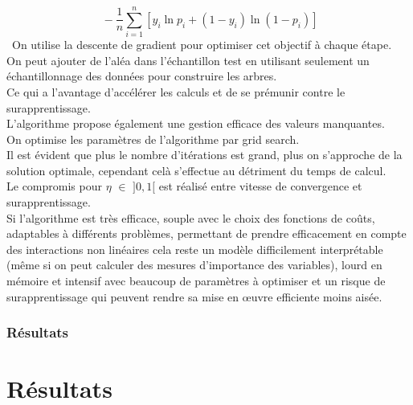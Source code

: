 \documentclass[french]{article}
\begin{document}
\begin{multicols}{2}
 \[\ -\frac{1}{n} \sum_{i=1}^{n} \left[y_{i} \ln p_{i}+\left(1-y_{i}\right) \ln \left(1-p_{i}\right)\right] \]\
On utilise la descente de gradient pour optimiser cet objectif à chaque étape.\\
On peut ajouter de l'aléa dans l'échantillon test en utilisant seulement un échantillonnage des données pour construire les arbres.\\
Ce qui a l'avantage d'accélérer les calculs et de se prémunir contre le surapprentissage.\\
L'algorithme propose également une gestion efficace des valeurs manquantes.\\
On optimise les paramètres de l'algorithme par grid search.\\
Il est évident que plus le nombre d'itérations est grand, plus on s'approche de la solution optimale, cependant celà s'effectue au détriment du temps de calcul.\\
Le compromis pour $\eta$ $\in$ $]0,1[ $ est réalisé entre vitesse de convergence et surapprentissage.\\
Si l'algorithme est très efficace, souple avec le choix des fonctions de coûts,
adaptables à différents problèmes, permettant de prendre efficacement en compte des interactions non linéaires cela reste un modèle difficilement interprétable (même si on peut calculer des mesures d'importance des variables), lourd en mémoire et intensif avec beaucoup de paramètres à optimiser et un risque de surapprentissage qui peuvent rendre sa mise en œuvre efficiente moins aisée.


\subsubsection{Résultats}









\section{Résultats}


\end{multicols}
\end{document}
